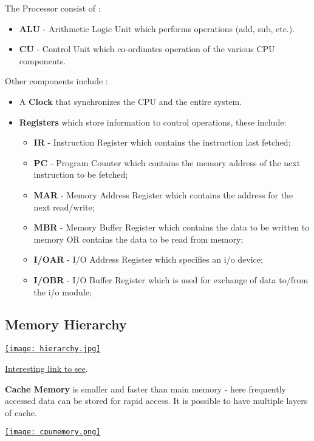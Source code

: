 \documentclass[10pt,a4paper,openany]{book}
\begin{document}
    The Processor consist of :
    \begin{itemize}
    \item \textbf{ALU} - Arithmetic Logic Unit which performs operations (add, sub, etc.).
    \item \textbf{CU} - Control Unit which co-ordinates operation of the various CPU components.
    \end{itemize}
    Other components include :
    \begin{itemize}
    \item A \textbf{Clock} that synchronizes the CPU and the entire system.
    \item \textbf{Registers} which store information to control operations, these include:
        \begin{itemize}
        \item \textbf{IR} - Instruction Register which contains the instruction last fetched;
        \item \textbf{PC} - Program Counter which contains the memory address of the next instruction to be fetched;
        \item \textbf{MAR} - Memory Address Register which contains the address for the next read/write;
        \item \textbf{MBR} - Memory Buffer Register which contains the data to be written to memory OR contains the data to be read  from memory;
        \item \textbf{I/OAR} - I/O Address Register which specifies an i/o device;
        \item \textbf{I/OBR} - I/O Buffer Register which is used for exchange of data to/from the i/o module;
        \end{itemize}
    \end{itemize}

    \subsection{Memory Hierarchy}
    \href{http://cse1.net/recaps/img/4-hierarchy.jpg}{\texttt{[image: hierarchy.jpg]}}

    \href{http://computer.howstuffworks.com/virtual-memory.html}{Interesting link to see}.

    \textbf{Cache Memory} is smaller and faster than main memory - here frequently accessed data can be stored for rapid access. It is possible to have multiple layers of cache.

    \begin{center}
    \href{https://static.lwn.net/images/cpumemory/cpumemory.1.png}{\texttt{[image: cpumemory.png]}}
    \end{center}
\end{document}
